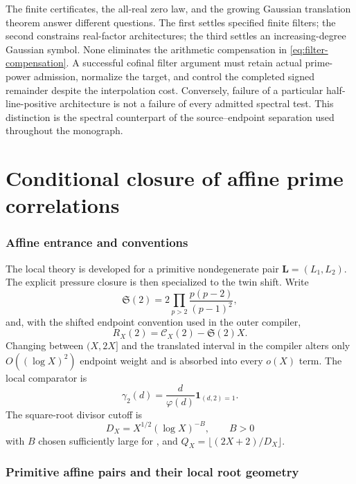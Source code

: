 \documentclass[11pt]{article}
\theoremstyle{definition}
\theoremstyle{remark}
\newcommand{\one}{\mathbf 1}
\begin{document}
The finite certificates, the all-real zero law, and the growing Gaussian
translation theorem answer different questions.  The first settles
specified finite filters; the second constrains real-factor architectures;
the third settles an increasing-degree Gaussian symbol.  None eliminates
the arithmetic compensation in \eqref{eq:filter-compensation}.  A
successful cofinal filter argument must retain actual prime-power
admission, normalize the target, and control the completed signed
remainder despite the interpolation cost.  Conversely, failure of a
particular half-line-positive architecture is not a failure of every
admitted spectral test.  This distinction is the spectral counterpart
of the source--endpoint separation used throughout the monograph.



\part{Conditional closure of affine prime correlations}

\section{Affine entrance and conventions}
\label{sec:affine-entrance}

The local theory is developed for a primitive nondegenerate pair
$\bm L=(L_1,L_2)$.  The explicit pressure closure is then specialized to the
twin shift.  Write
\[
 \mathfrak S(2)=2\prod_{p>2}\frac{p(p-2)}{(p-1)^2},
\]
and, with the shifted endpoint convention used in the outer compiler,
\[
 R_X(2)=\mathcal C_X(2)-\mathfrak S(2)X.
\]
Changing between $(X,2X]$ and the translated interval in the compiler alters
only $O((\log X)^2)$ endpoint weight and is absorbed into every $o(X)$ term.
The local comparator is
\[
 \gamma_2(d)=\frac d{\varphi(d)}\one_{(d,2)=1}.
\]
The square-root divisor cutoff is
\[
 D_X=X^{1/2}(\log X)^{-B},\qquad B>0
\]
with $B$ chosen sufficiently large for , and
$Q_X=\lfloor(2X+2)/D_X\rfloor$.

\section{Primitive affine pairs and their local root geometry}
\label{sec:local-geometry}
\end{document}
